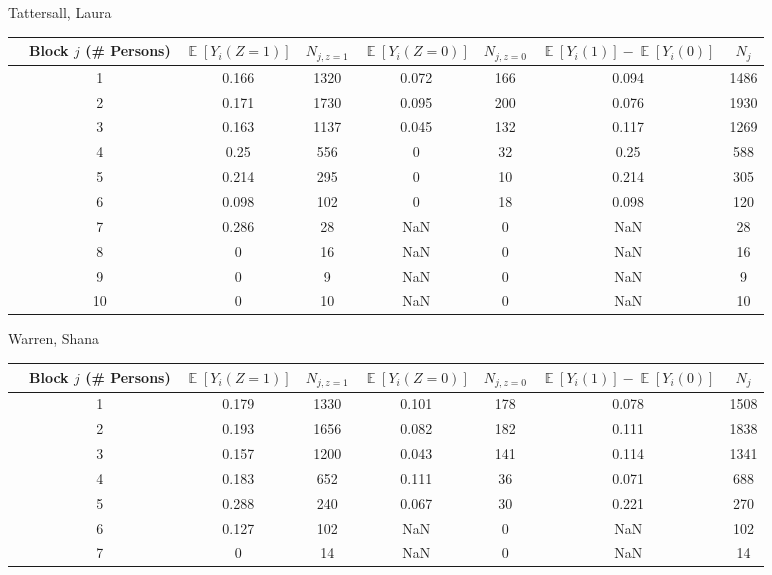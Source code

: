 \documentclass[11pt,notitlepage]{article}
\def\E{\mathop{\mathbb{E}}}
\begin{document}
Tattersall, Laura


\begin{table}[h!]\small
\begin{center}
\begin{tabular}{rc|cc|cc|cc}
  \hline
 & Block $j$ (\# Persons) & $\E[Y_i(Z=1)]$ & $N_{j, z=1}$ & $\E[Y_i(Z=0)]$ & $N_{j, z=0}$ & $\E[Y_i(1)]-\E[Y_i(0)]$ & $N_j$ \\ 
  \hline
  & 1 & 0.166 & 1320 & 0.072 & 166 & 0.094 & 1486 \\ 
  & 2 & 0.171 & 1730 & 0.095 & 200 & 0.076 & 1930 \\ 
  & 3 & 0.163 & 1137 & 0.045 & 132 & 0.117 & 1269 \\ 
  & 4 & 0.25 & 556 & 0 & 32 & 0.25 & 588 \\ 
  & 5 & 0.214 & 295 & 0 & 10 & 0.214 & 305 \\ 
  & 6 & 0.098 & 102 & 0 & 18 & 0.098 & 120 \\ 
  & 7 & 0.286 & 28 & NaN & 0 & NaN & 28 \\ 
  & 8 & 0 & 16 & NaN & 0 & NaN & 16 \\ 
  & 9 & 0 & 9 & NaN & 0 & NaN & 9 \\ 
   & 10 & 0 & 10 & NaN & 0 & NaN & 10 \\ 
   \hline
\end{tabular}
\end{center}
\end{table}




Warren, Shana


\begin{table}[h!]\small
\begin{center}
\begin{tabular}{rc|cc|cc|cc}
  \hline
 & Block $j$ (\# Persons) & $\E[Y_i(Z=1)]$ & $N_{j, z=1}$ & $\E[Y_i(Z=0)]$ & $N_{j, z=0}$ & $\E[Y_i(1)]-\E[Y_i(0)]$ & $N_j$ \\ 
  \hline
  & 1 & 0.179 & 1330 & 0.101 & 178 & 0.078 & 1508 \\ 
  & 2 & 0.193 & 1656 & 0.082 & 182 & 0.111 & 1838 \\ 
  & 3 & 0.157 & 1200 & 0.043 & 141 & 0.114 & 1341 \\ 
  & 4 & 0.183 & 652 & 0.111 & 36 & 0.071 & 688 \\ 
  & 5 & 0.288 & 240 & 0.067 & 30 & 0.221 & 270 \\ 
  & 6 & 0.127 & 102 & NaN & 0 & NaN & 102 \\ 
  & 7 & 0 & 14 & NaN & 0 & NaN & 14 \\ 
   \hline
\end{tabular}
\end{center}
\end{table}
\end{document}
